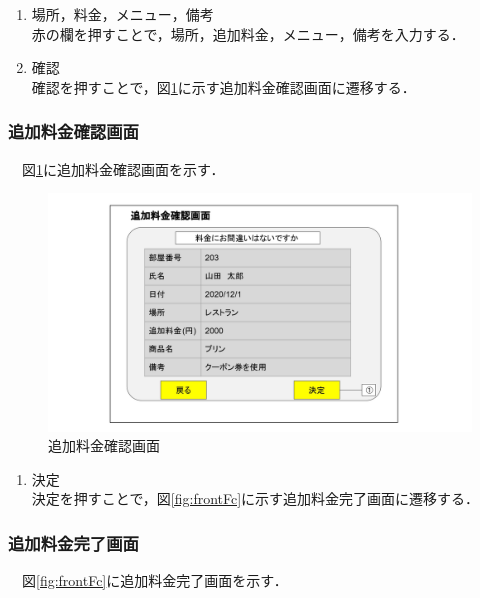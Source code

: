 \begin{enumerate}
\renewcommand{\labelenumi}{\textcircled{\scriptsize \theenumi}}
\item 場所，料金，メニュー，備考\\ 赤の欄を押すことで，場所，追加料金，メニュー，備考を入力する．
\item 確認\\ 確認を押すことで，図\ref{fig:frontFe}に示す追加料金確認画面に遷移する．
\end{enumerate}


\subsubsection{追加料金確認画面}
　図\ref{fig:frontFe}に追加料金確認画面を示す．

\begin{figure}[H]
 \centering
   \includegraphics[width=150mm]{UI_front/addfC.jpg}
 \caption{追加料金確認画面}
 \label{fig:frontFe}
\end{figure}

\begin{enumerate}
\renewcommand{\labelenumi}{\textcircled{\scriptsize \theenumi}}
\item 決定\\ 決定を押すことで，図\ref{fig:frontFc}に示す追加料金完了画面に遷移する．
\end{enumerate}


\subsubsection{追加料金完了画面}
　図\ref{fig:frontFc}に追加料金完了画面を示す．

